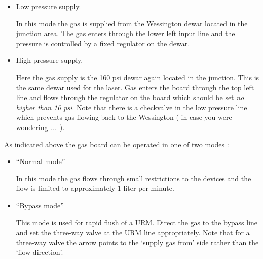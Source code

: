 \begin{itemize}

\item Low pressure supply.

  In this mode the gas is supplied from the Wessington dewar located in the junction area.
The gas enters through the lower left input line and the pressure is controlled by a
fixed regulator on the dewar.


\item High pressure supply.

 Here the gas supply is the 160 psi dewar again located in the junction. This
is the same dewar used for the laser. Gas enters the board through the top left line
and flows through the regulator on the board which should be set { \em no higher than 10 psi}. 
Note that there is a checkvalve in  the low pressure line which prevents gas 
flowing  back to the Wessington ( in case you were wondering ...~).


\end{itemize}



 As indicated above the gas board can be operated in one of two modes :

\begin{itemize}

\item ``Normal mode''

  In this mode the gas flows through small restrictions to the devices and the flow
is limited to approximately 1 liter per minute. 


\item ``Bypass mode'' 

  This mode is used  for rapid flush of a URM.   Direct the gas to the bypass
line and set the three-way valve at the URM line appropriately. Note that for
a three-way valve the arrow points to the `supply gas from' side rather than the
`flow direction'.


\end{itemize}
  

